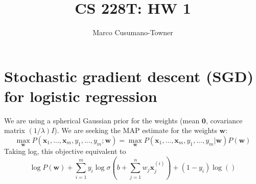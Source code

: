 \documentclass[11pt]{article}
\title{CS 228T: HW 1}
\author{Marco Cusumano-Towner}
\newcommand{\mb}[1]{\mathbf{#1}}
\begin{document}
\maketitle

\section{Stochastic gradient descent (SGD) for logistic regression}
We are using a spherical Gaussian prior for the weights (mean $\mb{0}$, covariance matrix $(1/\lambda)I$). We are seeking the MAP estimate for the weights $\mb{w}$:
\[ \max_{\mb{w}} P(\mb{x}_1,\ldots,\mb{x}_m,y_1,\ldots,y_m; \mb{w}) = \max_{\mb{w}} P(\mb{x}_1,\ldots,\mb{x}_m,y_1,\ldots,y_m | \mb{w}) P(\mb{w})\]
Taking log, this objective equivalent to
\[\log P(\mb{w}) + \sum_{i=1}^m y_i \log \sigma(b + \sum_{j=1}^n w_j \mb{x}^{(i)}_j ) + (1-y_i) \log () \]
\end{document}
